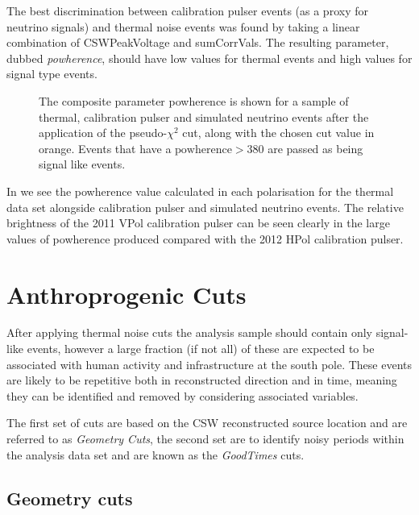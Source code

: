 The best discrimination between calibration pulser events (as a proxy for neutrino signals) and thermal noise events was found by taking a linear combination of CSWPeakVoltage and sumCorrVals. The resulting parameter, dubbed \textit{powherence}, should have low values for thermal events and high values for signal type events.


\begin{figure}[htpb]
  \hfill
  \caption{The composite parameter powherence is shown for a sample of thermal, calibration pulser and simulated neutrino events after the application of the pseudo-$\chi^{2}$ cut, along with the chosen cut value in orange. Events that have a $\mbox{powherence} > 380$ are passed as being signal like events.}
  \label{fig:Analysis:Thermal-Cuts:Powherence}
\end{figure}

In  we see the powherence value calculated in each polarisation for the thermal data set alongside calibration pulser and simulated neutrino events. The relative brightness of the 2011 VPol calibration pulser can be seen clearly in the large values of powherence produced compared with the 2012 HPol calibration pulser.


\section{Anthroprogenic Cuts}
\label{sec:Analysis:Anthroprogenic-Cuts}

After applying thermal noise cuts the analysis sample should contain only signal-like events, however a large fraction (if not all) of these are expected to be associated with human activity and infrastructure at the south pole. These events are likely to be repetitive both in reconstructed direction and in time, meaning they can be identified and removed by considering associated variables.

The first set of cuts are based on the CSW reconstructed source location and are referred to as \textit{Geometry Cuts}, the second set are to identify noisy periods within the analysis data set and are known as the \textit{GoodTimes} cuts.

\subsection{Geometry cuts}
\label{sec:Analysis:Anthroprogenic-Cuts:Geometry-Cuts}

